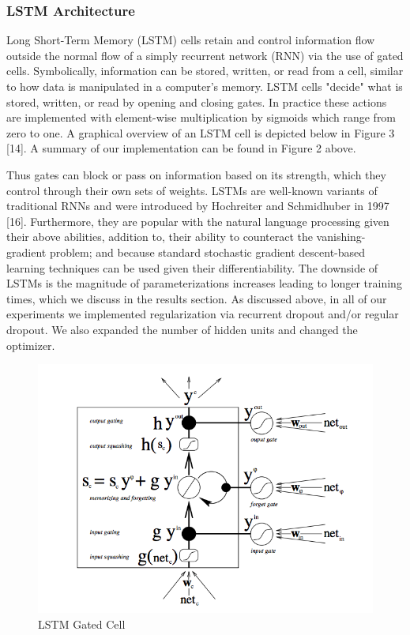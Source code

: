 \documentclass[10pt, twocolumn, letterpaper]{article}
\begin{document}
\subsubsection{LSTM Architecture}
Long Short-Term Memory (LSTM) cells retain and control information flow outside the normal flow of a simply recurrent network (RNN) via the use of gated cells. Symbolically, information can be stored, written, or read from a cell, similar to how data is manipulated in a computer’s memory. LSTM cells "decide" what is stored, written, or read by opening and closing gates. In practice these actions are implemented with element-wise multiplication by sigmoids which range from zero to one. A graphical overview of an LSTM cell is depicted below in Figure 3 [14]. A summary of our implementation can be found in Figure 2 above.

Thus gates can block or pass on information based on its strength, which they control through their own sets of weights. LSTMs are well-known variants of traditional RNNs and were introduced by Hochreiter and Schmidhuber in 1997 [16]. Furthermore, they are popular with the natural language processing given their above abilities, addition to, their ability to counteract the vanishing-gradient problem; and because standard stochastic gradient descent-based learning techniques can be used given their differentiability. The downside of LSTMs is the magnitude of parameterizations increases leading to longer training times, which we discuss in the results section. As discussed above, in all of our experiments we implemented regularization via recurrent dropout and/or regular dropout. We also expanded the number of hidden units and changed the optimizer.

\begin{figure}[!ht]
\includegraphics[scale=0.38]{LSTM.png}
\caption{LSTM Gated Cell}
\end{figure}
\end{document}
